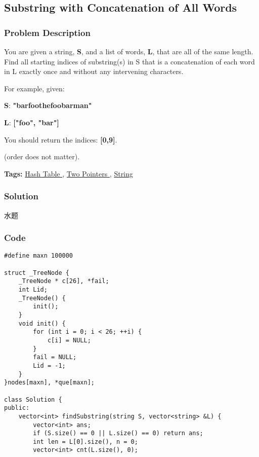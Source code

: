 \documentclass{article}
\begin{document}
\begin{CJK*}{UTF8}{gkai}
\subsection{ Substring with Concatenation of All Words }
\label{ Substring with Concatenation of All Words }

\subsubsection*{Problem Description}
You are given a string, \textbf{S}, and a list of words, \textbf{L}, that are all of the same length. Find all starting indices of substring(s) in S that is a concatenation of each word in L exactly once and without any intervening characters.

For example, given:


\textbf{S}: \textbf{"barfoothefoobarman"}


\textbf{L}: \textbf{["foo", "bar"]}

You should return the indices: \textbf{[0,9]}.


(order does not matter).


\textbf{Tags: }
\hyperref[ Hash Table ]{ Hash Table },  \hyperref[ Two Pointers ]{ Two Pointers },  \hyperref[ String ]{ String }



\subsubsection*{Solution}
水题

\subsubsection*{Code}
\begin{lstlisting}
#define maxn 100000

struct _TreeNode {
    _TreeNode * c[26], *fail;
    int Lid;
    _TreeNode() {
        init();
    }
    void init() {
        for (int i = 0; i < 26; ++i) {
            c[i] = NULL;
        }
        fail = NULL;
        Lid = -1;
    }
}nodes[maxn], *que[maxn];

class Solution {
public:
    vector<int> findSubstring(string S, vector<string> &L) {
        vector<int> ans;
        if (S.size() == 0 || L.size() == 0) return ans;
        int len = L[0].size(), n = 0;
        vector<int> cnt(L.size(), 0);
        

\end{lstlisting}
\end{CJK*}
\end{document}
